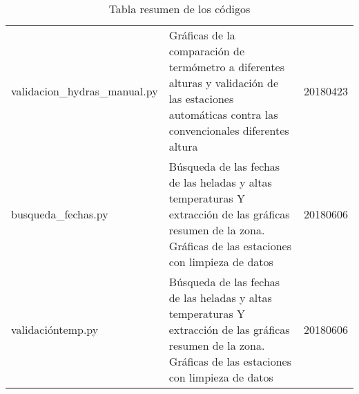 \begin{landscape}
\begin{table}[ht]
{\begin{tabular}{lll}
validacion\_hydras\_manual.py & Gráficas de la comparación de termómetro a diferentes alturas y validación de las estaciones automáticas contra las convencionales diferentes altura                                  & 20180423 \\
busqueda\_fechas.py & Búsqueda de las fechas de las heladas y altas temperaturas Y extracción de las gráficas resumen de la zona. Gráficas de las estaciones con limpieza de datos & 20180606\\
validacióntemp.py & Búsqueda de las fechas de las heladas y altas temperaturas Y extracción de las gráficas resumen de la zona. Gráficas de las estaciones con limpieza de datos & 20180606
\end{tabular}}
\caption{Tabla resumen de los códigos}
\label{tabla_resumen}
\end{table}



\end{landscape}
